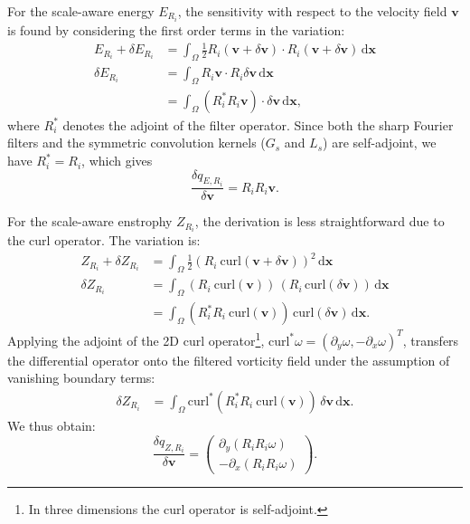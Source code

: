 \documentclass[]{elsarticle}
\newcommand{\D}{\mathrm{d}}
\begin{document}
For the scale-aware energy $E_{R_i}$, the sensitivity with respect to the velocity field $\boldsymbol{v}$ is found by considering the first order terms in the variation:
\begin{align}
    E_{R_i} + \delta E_{R_i} &= \int_\Omega \frac{1}{2} R_{i} (\boldsymbol{v} + \delta \boldsymbol{v}) \cdot R_{i} (\boldsymbol{v} + \delta \boldsymbol{v}) \, \D \boldsymbol{x} \nonumber\\
    \delta E_{R_i} &= \int_\Omega R_{i} \boldsymbol{v} \cdot R_{i}  \delta \boldsymbol{v} \, \D \boldsymbol{x} \nonumber \\
    &= \int_\Omega (R_{i}^* R_{i} \boldsymbol{v}) \cdot \delta \boldsymbol{v} \, \D \boldsymbol{x},
\end{align}
where $R_{i}^*$ denotes the adjoint of the filter operator. Since both the sharp Fourier filters and the symmetric convolution kernels ($G_s$ and $L_s$) are self-adjoint, we have $R_{i}^* = R_{i}$, which gives
\begin{equation}
    \frac{\delta q_{E,R_i}}{\delta \boldsymbol{v}} = R_{i} R_i \boldsymbol{v}.
\end{equation}

For the scale-aware enstrophy $Z_{R_i}$, the derivation is less straightforward due to the curl operator. The variation is:
\begin{align}
    Z_{R_i} + \delta Z_{R_i} &= \int_\Omega \frac{1}{2}(R_i \ \text{curl}(\boldsymbol{v}+\delta \boldsymbol{v}))^2 \, \D \boldsymbol{x} \nonumber\\
    \delta Z_{R_i} &=\int_\Omega (R_i \ \text{curl}(\boldsymbol{v})) \, (R_i \, \text{curl}(\delta \boldsymbol{v})) \, \D \boldsymbol{x} \nonumber \\
    &=\int_\Omega (R_i^* R_i \ \text{curl}(\boldsymbol{v})) \, \text{curl}(\delta \boldsymbol{v}) \, \D \boldsymbol{x}.
\end{align}
Applying the adjoint of the 2D curl operator\footnote{In three dimensions the curl operator is self-adjoint.}, $\text{curl}^* \omega = (\partial_y \omega, -\partial_x \omega)^T$, transfers the differential operator onto the filtered vorticity field under the assumption of vanishing boundary terms:
\begin{align}
    \delta Z_{R_i} &= \int_\Omega \text{curl}^*(R_i^* R_i \ \text{curl}(\boldsymbol{v})) \, \delta \boldsymbol{v} \, \D \boldsymbol{x}.
\end{align}
We thus obtain:
\begin{equation}
    \frac{\delta q_{Z,R_i}}{\delta \boldsymbol{v}} = \begin{pmatrix} \partial_y (R_{i} R_i{\omega}) \\ -\partial_x (R_{i}R_i \omega) \end{pmatrix}.
\end{equation}
\end{document}
